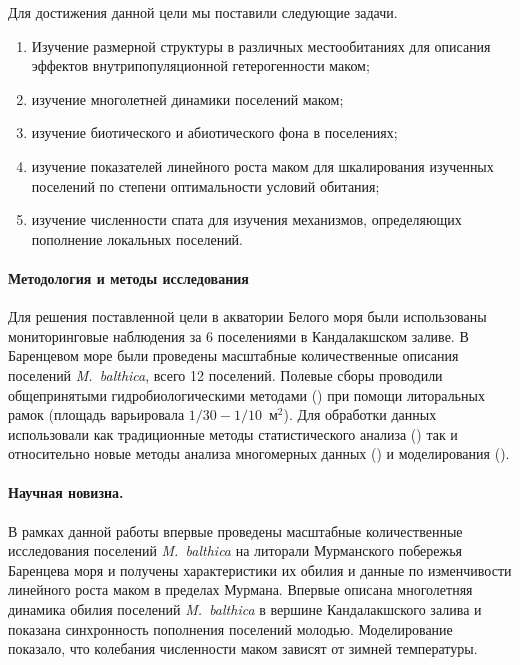 Для достижения данной цели мы поставили следующие задачи.
  \begin{enumerate}
    \item Изучение размерной %
структуры в различных местообитаниях для описания эффектов внутрипопуляционной гетерогенности маком;
    \item изучение многолетней динамики поселений маком;
    \item изучение биотического и абиотического фона в поселениях;
    \item изучение показателей линейного роста маком для шкалирования изученных поселений по степени оптимальности условий обитания;
    \item изучение численности спата для изучения механизмов, определяющих пополнение локальных поселений.
  \end{enumerate}

\paragraph{Методология и методы исследования}
Для решения поставленной цели в акватории Белого моря были использованы мониторинговые наблюдения за 6 поселениями в Кандалакшском заливе.
В Баренцевом море были проведены масштабные количественные описания поселений {\it M.~balthica}, всего 12 поселений.
Полевые сборы проводили общепринятыми гидробиологическими методами (\cite{Eleftheriou_2013}) при помощи литоральных рамок (площадь варьировала $1/30 - 1/10$~м$^2$).
Для обработки данных использовали как традиционные методы статистического анализа (\cite{Tukey_1977, Mardia_et_al_1979, Chambers_Hastie_1991, Legendre_Legendre_2012, Hollander_et_al_2013}) так и относительно новые методы анализа многомерных данных (\cite{Clarke_et_al_2008}) и моделирования (\cite{Berryman_Turchin_2001}).

\paragraph{Научная новизна.}
В рамках данной работы впервые проведены масштабные количественные исследования поселений \textit{M.~balthica} на литорали Мурманского побережья Баренцева моря и получены характеристики их обилия и данные по изменчивости линейного роста маком в пределах Мурмана.
Впервые описана многолетняя динамика обилия поселений \textit{M.~balthica} в вершине Кандалакшского залива и показана синхронность пополнения поселений молодью.
Моделирование показало, что колебания численности маком зависят от зимней температуры.

